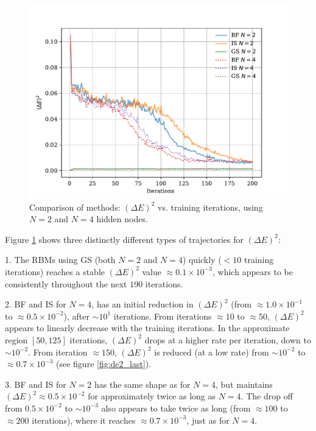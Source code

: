 \documentclass[%
oneside,                 %
final,                   %
10pt]{article}
\begin{document}
\begin{figure}[H]
        \centering 
         \includegraphics[scale=0.8]{../Results/sim_15/ns_interacting_de2_large.pdf} 
        \caption{Comparison of methods: $(\Delta E)^2$ vs. training iterations, using $N=2$ and $N=4$ hidden nodes. }
        \label{fig:de2_long}   
\end{figure}  


Figure \ref{fig:de2_long} shows three distinctly different types of trajectories for $(\Delta E)^2$:

1. The RBMs using GS (both $N=2$ and $N=4$) quickly ($<10$ training iterations) reaches a stable $(\Delta E)^2$ value $\approx 0.1 \times 10^{-3}$, which appears to be consistently throughout the next $190$ iterations. 

2. BF and IS for $N=4$, has an initial reduction in  $(\Delta E)^2$ (from $\approx 1.0 \times 10^{-1}$ to $\approx 0.5 \times 10^{-2}$), after $\sim 10^{1}$ iterations. From iterations $\approx 10$ to $\approx 50$, $(\Delta E)^2$ appears to linearly decrease with the training iterations. In the approximate region $[50, 125]$ iterations, $(\Delta E)^2$ drops at a higher rate per iteration, down to $\sim 10^{-2}$. From iteration $\approx 150$, $(\Delta E)^2$ is reduced (at a low rate) from $\sim 10^{-2}$ to $\approx 0.7 \times 10^{-3}$ (see figure \ref{fig:de2_last}).

3. BF and IS for $N=2$ has the same shape as for $N=4$, but maintains  $(\Delta E)^2 \approx 0.5 \times 10^{-2}$ for approximately twice as long as $N=4$. The drop off from $0.5 \times  10^{-2}$ to $\sim 10^{-3}$ also appears to take twice as long (from $\approx 100$ to $\approx 200$ iterations), where it reaches $\approx 0.7 \times 10^{-3}$, just as for $N=4$.
\end{document}
